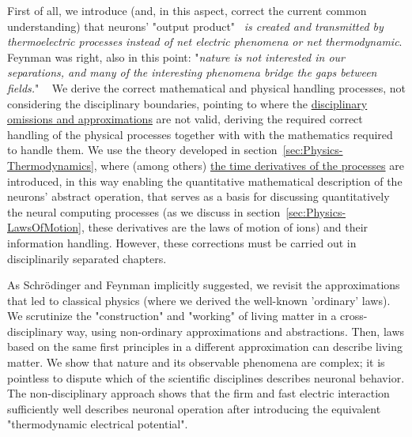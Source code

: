 \ifx\magyar\undefined
First of all, we introduce (and, in this aspect, correct the current common understanding)
that neurons' "output product"~\cite{BuzsakiCellAssemblies:2010}
\textit{is created and transmitted by thermoelectric processes instead of
	net electric phenomena or net thermodynamic}.
	Feynman was right, also in this point: "\textit{nature is not interested in our separations, and many of the interesting phenomena bridge the gaps between fields.}" ~\cite{FeynmanThinking:1980}
We derive the correct mathematical and physical handling processes,
not considering the disciplinary boundaries, pointing to where
the \hyperlink{Abstractions}{disciplinary omissions and approximations} are not valid,
deriving the required correct handling of the physical processes together with with the mathematics required to handle them.
We use the theory developed in section~\ref{sec:Physics-Thermodynamics},
where (among others) \hyperlink{NernstPlanckTimeDerivatives}{the time derivatives of the processes} are introduced, in this way enabling the
quantitative mathematical description of the neurons' abstract operation,
that serves as a basis for discussing quantitatively the neural computing
processes (as we discuss in section~\ref{sec:Physics-LawsOfMotion},
these derivatives are the laws of motion of ions) and their information handling. However, these corrections must be carried out
in disciplinarily separated chapters.  
\else
\fi


\ifx\magyar\undefined

As Schr\"odinger and Feynman implicitly suggested, we revisit the approximations that led to classical physics (where we derived the well-known 'ordinary' laws).
We scrutinize the "construction" and "working" of living matter in a cross-disciplinary way, using non-ordinary approximations and abstractions.
Then, laws based on the same first principles in a different approximation can describe living matter.
We show that nature and its observable phenomena are complex; it is pointless to dispute
which of the scientific disciplines describes neuronal behavior. The non-disciplinary approach shows that the firm and fast electric interaction sufficiently well describes neuronal operation after introducing the equivalent "thermodynamic electrical potential".

\else
\fi


